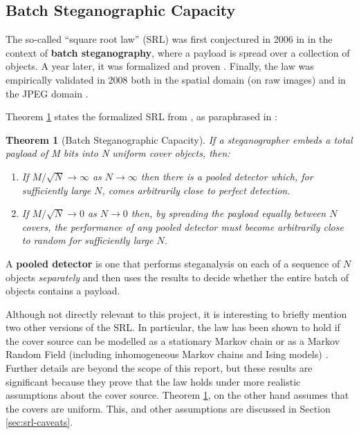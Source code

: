 \documentclass[11pt,a4paper,twoside,openright]{report}
\begin{document}
\subsection{Batch Steganographic Capacity} \label{sec:batch-capacity}

The so-called ``square root law'' (SRL) was first conjectured in 2006 in \cite{2006-batch-conjecture} in the context of \textbf{batch steganography}, where a payload is spread over a collection of objects. A year later, it was formalized and proven \cite{2007-batch-proof}. Finally, the law was empirically validated in 2008 both in the spatial domain (on raw images) and in the JPEG domain \cite{2008-paper}.

Theorem \ref{thm:square-root-law-batch} states the formalized SRL from \cite{2007-batch-proof}, as paraphrased in \cite{2008-paper}:

\newtheorem{square-root-law}{Theorem}
\begin{square-root-law}[Batch Steganographic Capacity] \label{thm:square-root-law-batch}
If a steganographer embeds a total payload of M bits into N uniform cover objects, then:
\begin{enumerate}
	\item If $M/\sqrt{N} \to \infty$ as $N \to \infty$ then there is a pooled detector which, for sufficiently large $N$, comes arbitrarily close to perfect detection.
	\item If $M/\sqrt{N} \to 0$ as $N \to 0$ then, by spreading the payload equally between $N$ covers, the performance of any pooled detector must become arbitrarily close to random for sufficiently large $N$.
\end{enumerate}
\end{square-root-law}

A \textbf{pooled detector} is one that performs steganalysis on each of a sequence of $N$ objects \textit{separately} and then uses the results to decide whether the entire batch of objects contains a payload.

Although not directly relevant to this project, it is interesting to briefly mention two other versions of the SRL. In particular, the law has been shown to hold if the cover source can be modelled as a stationary Markov chain \cite{srl-markov-covers} or as a Markov Random Field (including inhomogeneous Markov chains and Ising models) \cite{srl-markov-random-fields}. Further details are beyond the scope of this report, but these results are significant because they prove that the law holds under more realistic assumptions about the cover source. Theorem \ref{thm:square-root-law-batch}, on the other hand assumes that the covers are uniform. This, and other assumptions are discussed in Section \ref{sec:srl-caveats}.
\end{document}

